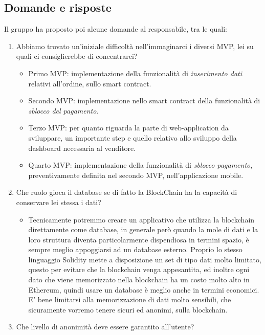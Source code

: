 \subsection{Domande e risposte}
Il gruppo ha proposto poi alcune domande al responsabile, tra le quali:
\begin{enumerate}
    \item Abbiamo trovato un'iniziale difficoltà nell'immaginarci i diversi MVP, lei su quali ci consiglierebbe di concentrarci?
          \begin{itemize}
              \item Primo MVP: implementazione della funzionalità di \textit{inserimento dati} relativi all'ordine, sullo smart contract.
              \item Secondo MVP: implementazione nello smart contract della funzionalità di \textit{sblocco del pagamento}.
              \item Terzo MVP: per quanto riguarda la parte di web-application da sviluppare, un importante step e quello relativo allo sviluppo della
                    dashboard necessaria al venditore.
              \item Quarto MVP: implementazione della funzionalità di \textit{sblocco pagamento}, preventivamente definita nel secondo MVP, nell'applicazione
                    mobile.
            \end{itemize}
    \item Che ruolo gioca il database se di fatto la BlockChain ha la capacità di conservare lei stessa i dati?
            \begin{itemize}
                \item Tecnicamente potremmo creare un applicativo che utilizza la blockchain direttamente come database, in generale però quando la mole di dati
                      e la loro struttura diventa particolarmente dispendiosa in termini spazio, è sempre meglio appoggiarsi ad un database esterno. 
                      Proprio lo stesso linguaggio Solidity mette a disposizione un set di tipo dati molto limitato, questo per evitare che la blockchain venga appesantita, ed
                      inoltre ogni dato che viene memorizzato nella blockchain ha un costo molto alto in Ethereum, quindi usare un database è meglio anche in termini economici.
                      E' bene limitarsi alla memorizzazione di dati molto sensibili, che sicuramente vorremo tenere sicuri ed anonimi, sulla blockchain.
            \end{itemize}
    \item Che livello di anonimità deve essere garantito all'utente?

\end{enumerate}
